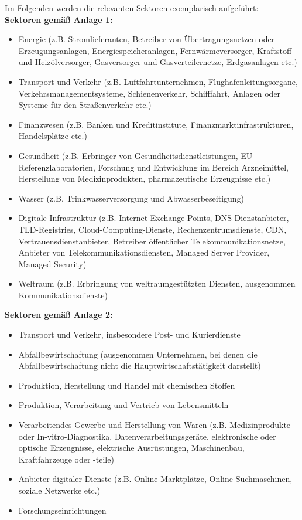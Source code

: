 Im Folgenden werden die relevanten Sektoren exemplarisch aufgeführt:\\
\textbf{Sektoren gemäß Anlage 1:}
\begin{itemize}
    \item Energie (z.B. Stromlieferanten, Betreiber von Übertragungsnetzen oder Erzeugungsanlagen, Energiespeicheranlagen, Fernwärmeversorger, Kraftstoff- und Heizölversorger, Gasversorger und Gasverteilernetze, Erdgasanlagen etc.)
    \item Transport und Verkehr (z.B. Luftfahrtunternehmen, Flughafenleitungsorgane, Verkehrsmanagementsysteme, Schienenverkehr, Schifffahrt, Anlagen oder Systeme für den Straßenverkehr etc.)
    \item Finanzwesen (z.B. Banken und Kreditinstitute, Finanzmarktinfrastrukturen, Handelsplätze etc.)
    \item Gesundheit (z.B. Erbringer von Gesundheitsdienstleistungen, EU-Referenzlaboratorien, Forschung und Entwicklung im Bereich Arzneimittel, Herstellung von Medizinprodukten, pharmazeutische Erzeugnisse etc.)
    \item Wasser (z.B. Trinkwasserversorgung und Abwasserbeseitigung)
    \item Digitale Infrastruktur (z.B. Internet Exchange Points, DNS-Dienstanbieter, TLD-Registries, Cloud-Computing-Dienste, Rechenzentrumsdienste, CDN, Vertrauensdienstanbieter, Betreiber öffentlicher Telekommunikationsnetze, Anbieter von Telekommunikationsdiensten, Managed Server Provider, Managed Security)
    \item Weltraum (z.B. Erbringung von weltraumgestützten Diensten, ausgenommen Kommunikationsdienste)
\end{itemize}
\newpage

\textbf{Sektoren gemäß Anlage 2:}

\begin{itemize}
    \item Transport und Verkehr, insbesondere Post- und Kurierdienste
    \item Abfallbewirtschaftung (ausgenommen Unternehmen, bei denen die Abfallbewirtschaftung nicht die Hauptwirtschaftstätigkeit darstellt)
    \item Produktion, Herstellung und Handel mit chemischen Stoffen
    \item Produktion, Verarbeitung und Vertrieb von Lebensmitteln
    \item Verarbeitendes Gewerbe und Herstellung von Waren (z.B. Medizinprodukte oder In-vitro-Diagnostika, Datenverarbeitungsgeräte, elektronische oder optische Erzeugnisse, elektrische Ausrüstungen, Maschinenbau, Kraftfahrzeuge oder -teile)
    \item Anbieter digitaler Dienste (z.B. Online-Marktplätze, Online-Suchmaschinen, soziale Netzwerke etc.)
    \item Forschungseinrichtungen
\end{itemize}
\newpage

